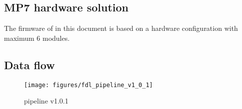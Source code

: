 \subsection{MP7 \finor hardware solution}

The firmware of \ufdl in this document is based on a hardware configuration with maximum 6 \ugt modules.

\subsection{Data flow}
\label{sec:fdl:data_flow}

\begin{figure}[htb]
\centering
\texttt{[image: figures/fdl\_pipeline\_v1\_0\_1]}
\caption{\ufdl pipeline v1.0.1}
\label{fig:fdl:mFDL_pipeline}
\end{figure}

